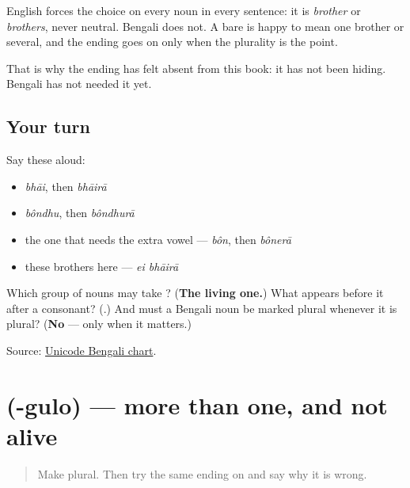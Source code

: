 \begin{grammarlens}[title={Grammar Lens: Bengali does not insist}]
English forces the choice on every noun in every sentence: it is \emph{brother} or \emph{brothers}, never neutral. Bengali does not. A bare \textbf{} is happy to mean one brother or several, and the ending goes on only when the plurality is the point.

That is why the ending has felt absent from this book: it has not been hiding. Bengali has not needed it yet.
\end{grammarlens}

\subsection*{Your turn}
Say these aloud:

\begin{itemize}
\raggedright
  \item \emph{bhāi}, then \emph{bhāirā}
  \item \emph{bôndhu}, then \emph{bôndhurā}
  \item the one that needs the extra vowel — \emph{bôn}, then \emph{bônerā}
  \item these brothers here — \emph{ei bhāirā}
\end{itemize}

\begin{tcolorbox}[breakable,colback=teal!4,colframe=teal!35!black,title={Before you move on}]
Which group of nouns may take \textbf{}? (\textbf{The living one.}) What appears before it after a consonant? (\textbf{}.) And must a Bengali noun be marked plural whenever it is plural? (\textbf{No} — only when it matters.)

Source: \href{https://www.unicode.org/charts/PDF/U0980.pdf}{Unicode Bengali chart}.
\end{tcolorbox}
\section[\texorpdfstring{\bn{গুলো} (-gulo)}{গুলো (-gulo)}]{ (-gulo) — more than one, and not alive}

\label{lesson:BN-C22-gulo}



\begin{quote}
Make \textbf{} plural. Then try the same ending on \textbf{} and say why it is wrong.
\end{quote}

